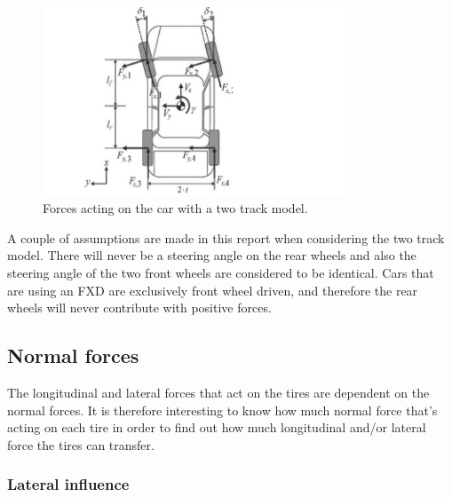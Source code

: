 \begin{figure}[h]
	\centering
	\includegraphics[width=0.8\textwidth]{Pictures/two_track_model}
	\caption{Forces acting on the car with a two track model.}
	\label{two_track_model}
\end{figure}

A couple of assumptions are made in this report when considering the two track model. There will never be a steering angle on the rear wheels and also the steering angle of the two front wheels are considered to be identical. Cars that are using an FXD are exclusively front wheel driven, and therefore the rear wheels will never contribute with positive forces. 



\subsection{Normal forces}

The longitudinal and lateral forces that act on the tires are dependent on the normal forces. It is therefore interesting to know how much normal force that's acting on each tire in order to find out how much longitudinal and/or lateral force the tires can transfer.

\subsubsection{Lateral influence}

